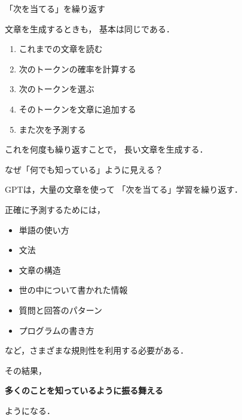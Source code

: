 \documentclass[aspectratio=169,professionalfonts]{beamer}
\begin{document}
\begin{frame}{「次を当てる」を繰り返す}

  文章を生成するときも，
  基本は同じである．

  \vspace{1em}

  \begin{enumerate}
    \item これまでの文章を読む
    \item 次のトークンの確率を計算する
    \item 次のトークンを選ぶ
    \item そのトークンを文章に追加する
    \item また次を予測する
  \end{enumerate}

  \vspace{1em}

  これを何度も繰り返すことで，
  長い文章を生成する．


\end{frame}


\begin{frame}{なぜ「何でも知っている」ように見える？}

  GPTは，大量の文章を使って
  「次を当てる」学習を繰り返す．

  \vspace{1em}

  正確に予測するためには，

  \begin{itemize}
    \item 単語の使い方
    \item 文法
    \item 文章の構造
    \item 世の中について書かれた情報
    \item 質問と回答のパターン
    \item プログラムの書き方
  \end{itemize}

  など，さまざまな規則性を利用する必要がある．

  \vspace{1em}

  その結果，

  \begin{center}
    \textbf{多くのことを知っているように振る舞える}
  \end{center}

  ようになる．


\end{frame}
\end{document}
